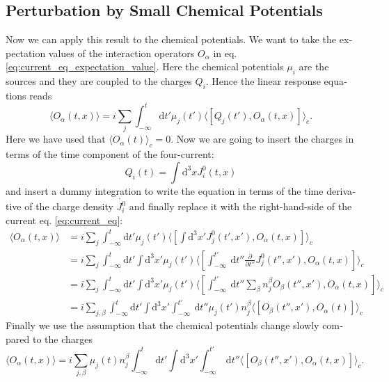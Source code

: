 \documentclass[master,       %
               twoside,        %
               BCOR10mm,       %
               english,ngerman, %
               ]{GAUBM}
\begin{document}
\begin{otherlanguage}{english}
\subsection{Perturbation by Small Chemical Potentials}
Now we can apply this result to the chemical potentials.
We want to take the expectation values of the interaction operators $O_\alpha$ in eq. \eqref{eq:current_eq_expectation_value}.
Here the chemical potentials $\mu_i$ are the sources and they are coupled to the charges $Q_i$.
Hence the linear response equations reads
\begin{equation}
	\langle O_\alpha(t, x) \rangle = i \sum_j \int_{-\infty}^t \mathrm{d} t' \mu_j(t') \langle [Q_j(t'), O_\alpha(t, x)] \rangle_c.
\end{equation}
Here we have used that $\langle O_\alpha(t) \rangle_c = 0$.
Now we are going to insert the charges in terms of the time component of the four-current:
\begin{equation}
	Q_i(t) = \int \mathrm{d}^3 x J^0_i(t, x)
\end{equation}
and insert a dummy integration to write the equation in terms of the time derivative of the charge density $\dot{J^0_i}$ and finally replace it with the right-hand-side of the current eq. \eqref{eq:current_eq}:
\begin{align}
	\langle O_\alpha(t, x) \rangle &= i \sum_j \int_{-\infty}^t \mathrm{d} t' \mu_j(t') \langle [\int \mathrm{d}^3 x' J^0_j(t', x'), O_\alpha(t, x)] \rangle_c \nonumber \\
	&= i \sum_j \int_{-\infty}^t \mathrm{d} t' \int \mathrm{d}^3 x'  \mu_j(t') \langle [\int^{t'}_{-\infty} \ \mathrm{d} t'' \frac{\partial}{\partial t''} J^0_j(t'', x'), O_\alpha(t, x)] \rangle_c \nonumber \\
	&= i \sum_j \int_{-\infty}^t \mathrm{d} t' \int \mathrm{d}^3 x'  \mu_j(t') \langle [\int^{t'}_{-\infty} \ \mathrm{d} t'' \sum_\beta n^\beta_j O_\beta(t'', x'), O_\alpha(t, x)] \rangle_c \nonumber \\
	&= i \sum_{j, \beta} \int_{-\infty}^t \mathrm{d} t' \int \mathrm{d}^3 x' \int^{t'}_{-\infty} \ \mathrm{d} t'' \mu_j(t') n^\beta_j \langle [ O_\beta(t'', x'), O_\alpha(t)] \rangle_c
\end{align}
Finally we use the assumption that the chemical potentials change slowly compared to the charges
\begin{equation}
	\langle O_\alpha(t, x) \rangle = i \sum_{j, \beta} \mu_j(t) n^\beta_j  \int_{-\infty}^t \mathrm{d} t' \int \mathrm{d}^3 x' \int^{t'}_{-\infty} \ \mathrm{d} t'' \langle [ O_\beta(t'', x'), O_\alpha(t, x)] \rangle_c.

\end{equation}
\end{otherlanguage}
\end{document}
